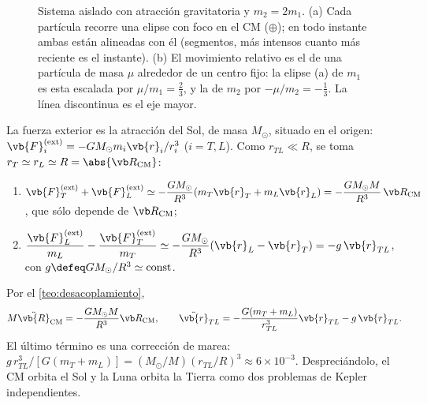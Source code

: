 \begin{figure}[ht]
\caption{Sistema aislado con atracción gravitatoria y $m_{2}=2m_{1}$.
(a) Cada partícula recorre una elipse con foco en el CM ($\oplus$); en todo instante ambas
están alineadas con él (segmentos, más intensos cuanto más reciente es el instante).
(b) El movimiento relativo es el de una partícula de masa $\mu$ alrededor de un centro
fijo: la elipse (a) de $m_{1}$ es esta escalada por $\mu/m_{1}=\tfrac23$, y la de $m_{2}$ por
$-\mu/m_{2}=-\tfrac13$. La línea discontinua es el eje mayor.}
\label{fig:orbitas}
\end{figure}

\begin{ejemplo}
\label{ej:tierra-luna}
La fuerza exterior es la atracción del Sol, de masa $M_{\odot}$, situado en el origen:
$\vb{F}_{i}\ext=-GM_{\odot}m_{i}\vb{r}_{i}/r_{i}^{3}$ ($i=T,L$). Como
$r_{TL}\ll R$, se toma $r_{T}\simeq r_{L}\simeq R=\abs{\Rcm}$:
\begin{enumerate}[label=\textup{(\roman*)},leftmargin=2em]
  \item $\vb{F}_{T}\ext+\vb{F}_{L}\ext\simeq-\dfrac{GM_{\odot}}{R^{3}}(m_{T}\vb{r}_{T}+m_{L}\vb{r}_{L})=-\dfrac{GM_{\odot}M}{R^{3}}\,\Rcm$, que sólo depende de $\Rcm$;
  \item $\dfrac{\vb{F}_{L}\ext}{m_{L}}-\dfrac{\vb{F}_{T}\ext}{m_{T}}\simeq-\dfrac{GM_{\odot}}{R^{3}}(\vb{r}_{L}-\vb{r}_{T})=-g\,\vb{r}_{TL}$, con $g\defeq GM_{\odot}/R^{3}\simeq\text{const}$.
\end{enumerate}
Por el \cref{teo:desacoplamiento},
\[
  M\ddot{\vb{R}}\cm=-\frac{GM_{\odot}M}{R^{3}}\Rcm,\qquad
  \ddot{\vb{r}}_{TL}=-\frac{G(m_{T}+m_{L})}{r_{TL}^{3}}\vb{r}_{TL}-g\,\vb{r}_{TL}.
\]
El último término es una corrección de marea:
$g\,r_{TL}^{3}/[G(m_{T}+m_{L})]=(M_{\odot}/M)(r_{TL}/R)^{3}\approx6\times10^{-3}$. Despreciándolo,
el CM orbita el Sol y la Luna orbita la Tierra como dos problemas de Kepler independientes.
\end{ejemplo}
